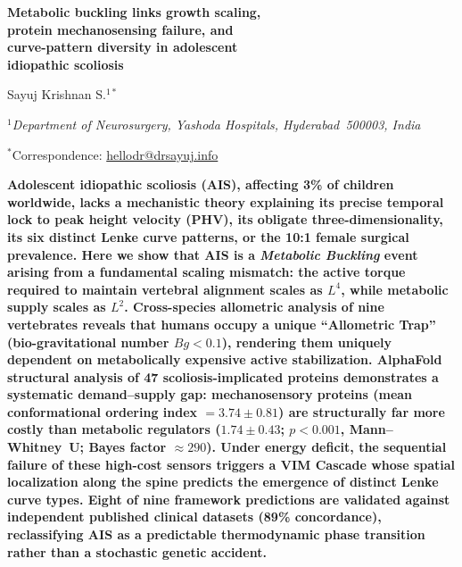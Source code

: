 \documentclass[12pt]{article}
\begin{document}
\linenumbers
\doublespacing

\begin{center}
{\LARGE\bfseries Metabolic buckling links growth scaling,\\[4pt]
protein mechanosensing failure, and\\[4pt]
curve-pattern diversity in adolescent\\[4pt]
idiopathic scoliosis}

\vspace{1.5em}
{\large Sayuj Krishnan S.$^{1\ast}$}

\vspace{0.8em}
{\itshape $^{1}$Department of Neurosurgery, Yashoda Hospitals, Hyderabad~500003, India}

\vspace{0.5em}
{$^\ast$Correspondence: \href{mailto:hellodr@drsayuj.info}{hellodr@drsayuj.info}}
\end{center}

\vspace{2em}

\noindent\textbf{Adolescent idiopathic scoliosis (AIS), affecting 3\% of children worldwide, lacks a mechanistic theory explaining its precise temporal lock to peak height velocity (PHV), its obligate three-dimensionality, its six distinct Lenke curve patterns, or the 10:1 female surgical prevalence. Here we show that AIS is a \emph{Metabolic Buckling} event arising from a fundamental scaling mismatch: the active torque required to maintain vertebral alignment scales as $L^4$, while metabolic supply scales as $L^2$. Cross-species allometric analysis of nine vertebrates reveals that humans occupy a unique ``Allometric Trap'' (bio-gravitational number $Bg < 0.1$), rendering them uniquely dependent on metabolically expensive active stabilization. AlphaFold structural analysis of 47 scoliosis-implicated proteins demonstrates a systematic demand--supply gap: mechanosensory proteins (mean conformational ordering index $= 3.74 \pm 0.81$) are structurally far more costly than metabolic regulators ($1.74 \pm 0.43$; $p < 0.001$, Mann--Whitney~U; Bayes factor $\approx 290$). Under energy deficit, the sequential failure of these high-cost sensors triggers a VIM Cascade whose spatial localization along the spine predicts the emergence of distinct Lenke curve types. Eight of nine framework predictions are validated against independent published clinical datasets (89\% concordance), reclassifying AIS as a predictable thermodynamic phase transition rather than a stochastic genetic accident.}
\end{document}
